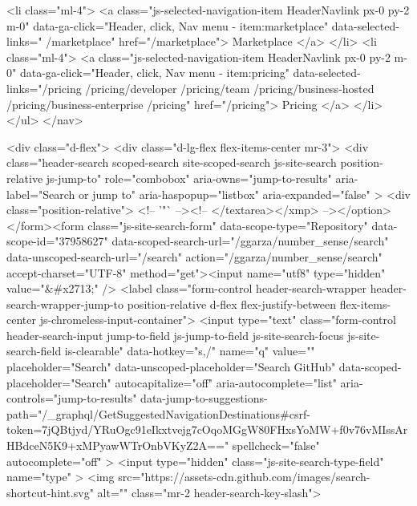               <li class="ml-4">
                    <a class="js-selected-navigation-item HeaderNavlink px-0 py-2 m-0" data-ga-click="Header, click, Nav menu - item:marketplace" data-selected-links=" /marketplace" href="/marketplace">
                      Marketplace
</a>              </li>
              <li class="ml-4">
                <a class="js-selected-navigation-item HeaderNavlink px-0 py-2 m-0" data-ga-click="Header, click, Nav menu - item:pricing" data-selected-links="/pricing /pricing/developer /pricing/team /pricing/business-hosted /pricing/business-enterprise /pricing" href="/pricing">
                  Pricing
</a>              </li>
          </ul>
        </nav>

      <div class="d-flex">
          <div class="d-lg-flex flex-items-center mr-3">
            <div class="header-search scoped-search site-scoped-search js-site-search position-relative js-jump-to"
  role="combobox"
  aria-owns="jump-to-results"
  aria-label="Search or jump to"
  aria-haspopup="listbox"
  aria-expanded="false"
>
  <div class="position-relative">
    <!-- '"` --><!-- </textarea></xmp> --></option></form><form class="js-site-search-form" data-scope-type="Repository" data-scope-id="37958627" data-scoped-search-url="/ggarza/number_sense/search" data-unscoped-search-url="/search" action="/ggarza/number_sense/search" accept-charset="UTF-8" method="get"><input name="utf8" type="hidden" value="&#x2713;" />
      <label class="form-control header-search-wrapper header-search-wrapper-jump-to position-relative d-flex flex-justify-between flex-items-center js-chromeless-input-container">
        <input type="text"
          class="form-control header-search-input jump-to-field js-jump-to-field js-site-search-focus js-site-search-field is-clearable"
          data-hotkey="s,/"
          name="q"
          value=""
          placeholder="Search"
          data-unscoped-placeholder="Search GitHub"
          data-scoped-placeholder="Search"
          autocapitalize="off"
          aria-autocomplete="list"
          aria-controls="jump-to-results"
          data-jump-to-suggestions-path="/_graphql/GetSuggestedNavigationDestinations#csrf-token=7jQBtjyd/YRuOgc91eIkxtvejg7cOqoMGgW80FHxsYoMW+f0v76vMIssArHBdceN5K9+xMPyawWTrOnbVKyZ2A=="
          spellcheck="false"
          autocomplete="off"
          >
          <input type="hidden" class="js-site-search-type-field" name="type" >
            <img src="https://assets-cdn.github.com/images/search-shortcut-hint.svg" alt="" class="mr-2 header-search-key-slash">

